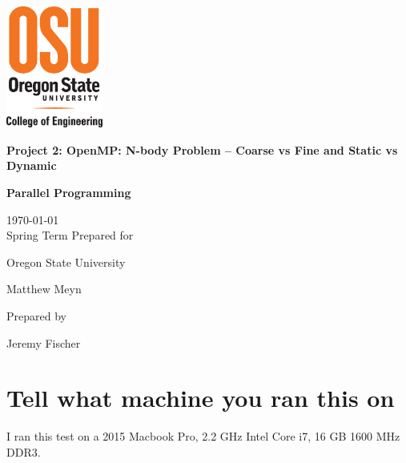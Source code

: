 \documentclass[onecolumn,draftclsnofoot, 10pt, compsoc]{IEEEtran}
\def \GroupNumber{		17}
\def \Jeremy{			Jeremy Fischer}
\def \Class{		Parallel Programming}
\def \Assn{		Project 2: OpenMP: N-body Problem -- Coarse vs Fine and Static vs Dynamic}
\def \School{	Oregon State University}
\def \Professor{		Matthew Meyn}
\begin{document}
\begin{titlepage}
    \begin{singlespace}
    	\includegraphics[height=4cm]{coe.eps}
        \hfill  
        \par\vspace{.2in}
        \centering
        \scshape{
            \vspace{.5in}
            \textbf{\Large\Assn}\par
            \textbf{\large\Class}\par
            \large{
            	\today \\Spring Term
        	}
            \vfill
            {\large Prepared for}\par
            \huge \School\par
            \vspace{5pt}
            {\Large{\Professor}\par}
            {\large Prepared by }\par
            \vspace{5pt}
            {\Large
                {\Jeremy}\par
            }
            \vspace{20pt}
        }

    \end{singlespace}
\end{titlepage}
\newpage
{}

\clearpage







	\section{Tell what machine you ran this on}	
	I ran this test on a 2015 Macbook Pro, 2.2 GHz Intel Core i7, 16 GB 1600 MHz DDR3.
	
\end{document}
